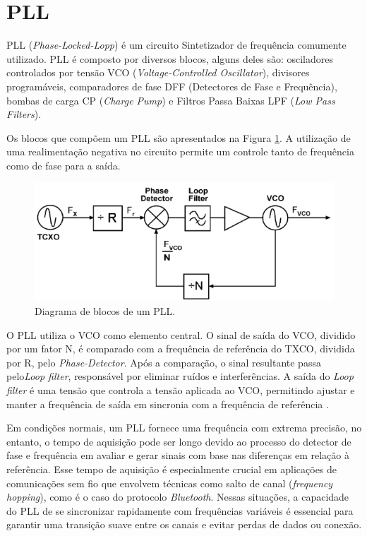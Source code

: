 \section{PLL}
PLL (\textit{Phase-Locked-Lopp}) é um circuito Sintetizador de frequência comumente utilizado. PLL é composto por diversos blocos, alguns deles são: osciladores controlados por tensão VCO (\textit{Voltage-Controlled Oscillator}), divisores programáveis, comparadores de fase DFF (Detectores de Fase e Frequência), bombas de carga CP (\textit{Charge Pump}) e Filtros Passa Baixas LPF (\textit{Low Pass Filters}). 

Os blocos que compõem um PLL são apresentados na Figura \ref{fig:pll_blocks}.
A utilização de uma realimentação negativa no circuito permite um controle tanto de frequência como de fase para a saída.

\begin{figure}[h!]
	\caption{Diagrama de blocos de um PLL.}
	\begin{center}
		\includegraphics[scale=0.6]{img/pll_blocos.png}
	\end{center}
	\label{fig:pll_blocks}
\end{figure}

O PLL utiliza o VCO como elemento central. O sinal de saída do VCO, dividido por um fator N, é comparado com a frequência de referência do TXCO, dividida por R, pelo  \textit{Phase-Detector}. Após a comparação, o sinal resultante passa pelo\textit{Loop filter}, responsável por eliminar ruídos e interferências. A saída do \textit{Loop filter} é uma tensão que controla a tensão aplicada ao VCO, permitindo ajustar e manter a frequência de saída em sincronia com a frequência de referência \cite{barrett_1999_fractionalintegern}.

Em condições normais, um PLL fornece uma frequência com extrema precisão, no entanto, o tempo de aquisição pode ser longo devido ao processo do detector de fase e frequência em avaliar e gerar sinais com base nas diferenças em relação à referência. Esse tempo de aquisição é especialmente crucial em aplicações de comunicações sem fio que envolvem técnicas como salto de canal (\textit{frequency hopping}), como é o caso do protocolo \textit{Bluetooth}. Nessas situações, a capacidade do PLL de se sincronizar rapidamente com frequências variáveis é essencial para garantir uma transição suave entre os canais e evitar perdas de dados ou conexão.

